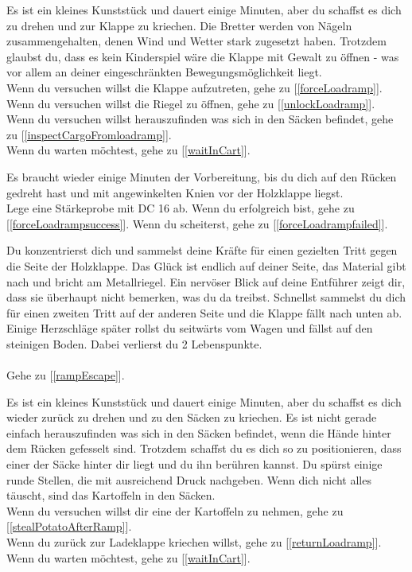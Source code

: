 
Es ist ein kleines Kunststück und dauert einige Minuten, aber du schaffst es dich zu drehen und zur Klappe zu kriechen. Die Bretter werden von Nägeln zusammengehalten, denen Wind und Wetter stark zugesetzt haben. Trotzdem glaubst du, dass es kein Kinderspiel wäre die Klappe mit Gewalt zu öffnen - was vor allem an deiner eingeschränkten Bewegungsmöglichkeit liegt.
\\Wenn du versuchen willst die Klappe aufzutreten, gehe zu [\ref{forceLoadramp}].
\\Wenn du versuchen willst die Riegel zu öffnen, gehe zu [\ref{unlockLoadramp}].
\\Wenn du versuchen willst herauszufinden was sich in den Säcken befindet, gehe zu [\ref{inspectCargoFromloadramp}].
\\Wenn du warten möchtest, gehe zu [\ref{waitInCart}].


Es braucht wieder einige Minuten der Vorbereitung, bis du dich auf den Rücken gedreht hast und mit angewinkelten Knien vor der Holzklappe liegst.\\
Lege eine Stärkeprobe mit DC 16 ab. Wenn du erfolgreich bist, gehe zu [\ref{forceLoadrampsuccess}].
Wenn du scheiterst, gehe zu [\ref{forceLoadrampfailed}].


Du konzentrierst dich und sammelst deine Kräfte für einen gezielten Tritt gegen die Seite der Holzklappe. Das Glück ist endlich auf deiner Seite, das Material gibt nach und bricht am Metallriegel. Ein nervöser Blick auf deine Entführer zeigt dir, dass sie überhaupt nicht bemerken, was du da treibst. Schnellst sammelst du dich für einen zweiten Tritt auf der anderen Seite und die Klappe fällt nach unten ab. Einige Herzschläge später rollst du seitwärts vom Wagen und fällst auf den steinigen Boden. Dabei verlierst du 2 Lebenspunkte.\\
\\Gehe zu [\ref{rampEscape}].


Es ist ein kleines Kunststück und dauert einige Minuten, aber du schaffst es dich wieder zurück zu drehen und zu den Säcken zu kriechen. Es ist nicht gerade einfach herauszufinden was sich in den Säcken befindet, wenn die Hände hinter dem Rücken gefesselt sind. Trotzdem schaffst du es dich so zu positionieren, dass einer der Säcke hinter dir liegt und du ihn berühren kannst. Du spürst einige runde Stellen, die mit ausreichend Druck nachgeben. Wenn dich nicht alles täuscht, sind das Kartoffeln in den Säcken.
\\Wenn du versuchen willst dir eine der Kartoffeln zu nehmen, gehe zu [\ref{stealPotatoAfterRamp}].
\\Wenn du zurück zur Ladeklappe kriechen willst, gehe zu [\ref{returnLoadramp}].
\\Wenn du warten möchtest, gehe zu [\ref{waitInCart}].


